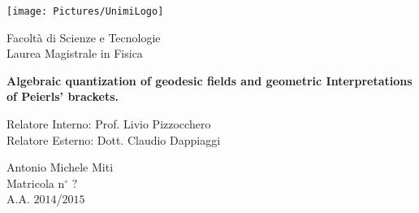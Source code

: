 {
\thispagestyle{empty}

\centerline{
\texttt{[image: Pictures/UnimiLogo]}
}

\begin{center}
{\Large Facoltà di Scienze e Tecnologie\\
\vskip0.2cm Laurea Magistrale in Fisica }
\end{center}


\vskip1.5cm
\begin{center}
{\huge \textbf{Algebraic quantization of geodesic fields and geometric Interpretations of Peierls' brackets.}}
\end{center}

{\large
\vskip20mm Relatore Interno:  Prof. Livio Pizzocchero \\
						Relatore Esterno: Dott. Claudio Dappiaggi
}

\vskip2cm
\hskip9cm\parbox[t]{7cm}
{\large 
Antonio Michele Miti\\
Matricola n$^\circ$ $?$\\
A.A. $2014$/$2015$\\
}

\newpage
\newpage
\thispagestyle{empty}
\clearpage
}

